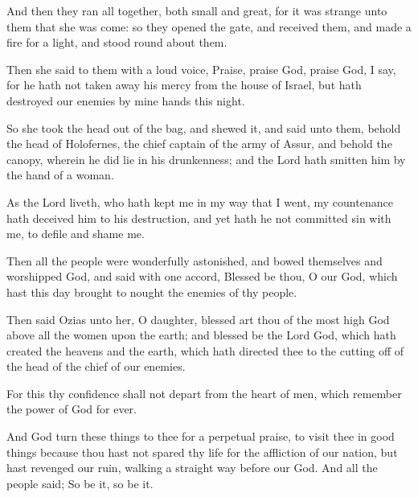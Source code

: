 {\par }{\PP {}And then they ran all together, both small and great, for it was strange unto them that she was come: so they opened the gate, and received them, and made a fire for a light, and stood round about them.
\par }{\PP {}Then she said to them with a loud voice, Praise, praise God, praise God, I say, for he hath not taken away his mercy from the house of Israel, but hath destroyed our enemies by mine hands this night.
\par }{\PP {}So she took the head out of the bag, and shewed it, and said unto them, behold the head of Holofernes, the chief captain of the army of Assur, and behold the canopy, wherein he did lie in his drunkenness; and the Lord hath smitten him by the hand of a woman.
\par }{\PP {}As the Lord liveth, who hath kept me in my way that I went, my countenance hath deceived him to his destruction, and yet hath he not committed sin with me, to defile and shame me.
\par }{\PP {}Then all the people were wonderfully astonished, and bowed themselves and worshipped God, and said with one accord, Blessed be thou, O our God, which hast this day brought to nought the enemies of thy people.
\par }{\PP {}Then said Ozias unto her, O daughter, blessed art thou of the most high God above all the women upon the earth; and blessed be the Lord God, which hath created the heavens and the earth, which hath directed thee to the cutting off of the head of the chief of our enemies.
\par }{\PP {}For this thy confidence shall not depart from the heart of men, which remember the power of God for ever.
\par }{\PP {}And God turn these things to thee for a perpetual praise, to visit thee in good things because thou hast not spared thy life for the affliction of our nation, but hast revenged our ruin, walking a straight way before our God. And all the people said; So be it, so be it.

}
